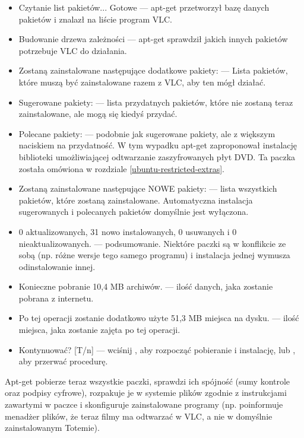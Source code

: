 \begin{itemize}
\item \textcolor{ubuntu_orange}{Czytanie list pakietów... Gotowe} --- apt-get przetworzył bazę danych pakietów i znalazł na liście program VLC.
\item \textcolor{ubuntu_orange}{Budowanie drzewa zależności} --- apt-get sprawdził jakich innych pakietów potrzebuje VLC do działania.
\item \textcolor{ubuntu_orange}{Zostaną zainstalowane następujące dodatkowe pakiety:} --- Lista pakietów, które muszą być zainstalowane razem z VLC, aby ten mógł działać.
\item \textcolor{ubuntu_orange}{Sugerowane pakiety:} --- lista przydatnych pakietów, które nie zostaną teraz zainstalowane, ale mogą się kiedyś przydać.
\item \textcolor{ubuntu_orange}{Polecane pakiety:} --- podobnie jak sugerowane pakiety, ale z większym naciskiem na przydatność. W tym wypadku apt-get zaproponował instalację biblioteki umożliwiającej odtwarzanie zaszyfrowanych płyt DVD. Ta paczka została omówiona w rozdziale \ref{ubuntu-restricted-extras}.
\item \textcolor{ubuntu_orange}{Zostaną zainstalowane następujące NOWE pakiety:} --- lista wszystkich pakietów, które zostaną zainstalowane. Automatyczna instalacja sugerowanych i polecanych pakietów domyślnie jest wyłączona.
\item \textcolor{ubuntu_orange}{0 aktualizowanych, 31 nowo instalowanych, 0 usuwanych i 0 nieaktualizowanych.} --- podsumowanie. Niektóre paczki są w konflikcie ze sobą (np. różne wersje tego samego programu) i instalacja jednej wymusza odinstalowanie innej.
\item \textcolor{ubuntu_orange}{Konieczne pobranie 10,4 MB archiwów.} --- ilość danych, jaka zostanie  pobrana z internetu.
\item \textcolor{ubuntu_orange}{Po tej operacji zostanie dodatkowo użyte 51,3 MB miejsca na dysku.} --- ilość miejsca, jaka zostanie zajęta po tej operacji.
\item \textcolor{ubuntu_orange}{Kontynuować? [T/n]} --- wciśnij , aby rozpocząć pobieranie i instalację, lub , aby przerwać procedurę.
\end{itemize}

Apt-get pobierze teraz wszystkie paczki, sprawdzi ich spójność (sumy kontrole oraz podpisy cyfrowe), rozpakuje je w systemie plików zgodnie z instrukcjami zawartymi w paczce i skonfiguruje zainstalowane programy (np. poinformuje menadżer plików, że teraz filmy ma odtwarzać w VLC, a nie w domyślnie zainstalowanym Totemie).

